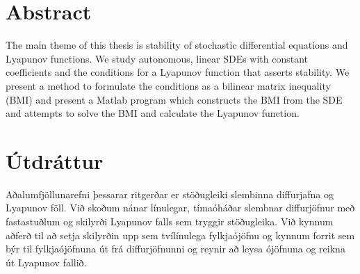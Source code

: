 \documentclass[a4paper,12pt,twoside,BCOR=10mm]{scrbook}
\begin{document}

\setcounter{page}{5}
\section*{\huge Abstract}
The main theme of this thesis is stability of stochastic differential equations and Lyapunov functions. We study autonomous, linear SDEs with constant coefficients and the conditions for a Lyapunov function that asserts stability. We present a method to formulate the conditions as a bilinear matrix inequality (BMI) and present a Matlab program which constructs the BMI from the SDE and attempts to solve the BMI and calculate the Lyapunov function.
\vfill \vspace*{1cm}
\section*{\huge Útdráttur}
Aðalumfjöllunarefni þessarar ritgerðar er stöðugleiki slembinna diffurjafna og Lyapunov föll. Við skoðum nánar línulegar, tímaóháðar slembnar diffurjöfnur með fastastuðlum og skilyrði Lyapunov falls sem tryggir stöðugleika. Við kynnum aðferð til að setja skilyrðin upp sem tvílínulega fylkjaójöfnu og kynnum forrit sem býr til fylkjaójöfnuna út frá diffurjöfnunni og reynir að leysa ójöfnuna og reikna út Lyapunov fallið.
\vfill
\newpage



\tableofcontents

\end{document}
